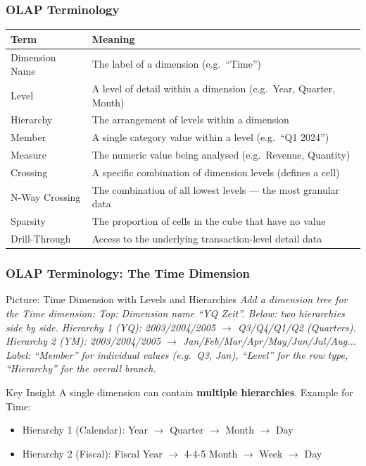 
\begin{frame}
  \frametitle{OLAP Terminology}

  \begin{tabularx}{\linewidth}{@{}l X@{}}
    \toprule
    \textbf{Term}       & \textbf{Meaning} \\
    \midrule
    Dimension Name      & The label of a dimension (e.g.\ ``Time'') \\
    Level               & A level of detail within a dimension (e.g.\ Year, Quarter, Month) \\
    Hierarchy           & The arrangement of levels within a dimension \\
    Member              & A single category value within a level (e.g.\ ``Q1 2024'') \\
    Measure             & The numeric value being analysed (e.g.\ Revenue, Quantity) \\
    Crossing            & A specific combination of dimension levels (defines a cell) \\
    N-Way Crossing      & The combination of all lowest levels --- the most granular data \\
    Sparsity            & The proportion of cells in the cube that have no value \\
    Drill-Through       & Access to the underlying transaction-level detail data \\
    \bottomrule
  \end{tabularx}
\end{frame}

\begin{frame}
  \frametitle{OLAP Terminology: The Time Dimension}

  \begin{alertblock}{Picture: Time Dimension with Levels and Hierarchies}
    \textit{Add a dimension tree for the Time dimension:
    Top: Dimension name ``YQ Zeit''.
    Below: two hierarchies side by side.
    Hierarchy 1 (YQ): 2003/2004/2005 $\to$ Q3/Q4/Q1/Q2 (Quarters).
    Hierarchy 2 (YM): 2003/2004/2005 $\to$ Jan/Feb/Mar/Apr/May/Jun/Jul/Aug...
    Label: ``Member'' for individual values (e.g.\ Q3, Jan),
    ``Level'' for the row type, ``Hierarchy'' for the overall branch.}
  \end{alertblock}

  \begin{block}{Key Insight}
    A single dimension can contain \textbf{multiple hierarchies}.
    Example for Time:
    \begin{itemize}
      \item Hierarchy 1 (Calendar): Year $\to$ Quarter $\to$ Month $\to$ Day
      \item Hierarchy 2 (Fiscal): Fiscal Year $\to$ 4-4-5 Month $\to$ Week $\to$ Day
    \end{itemize}
  \end{block}
\end{frame}

